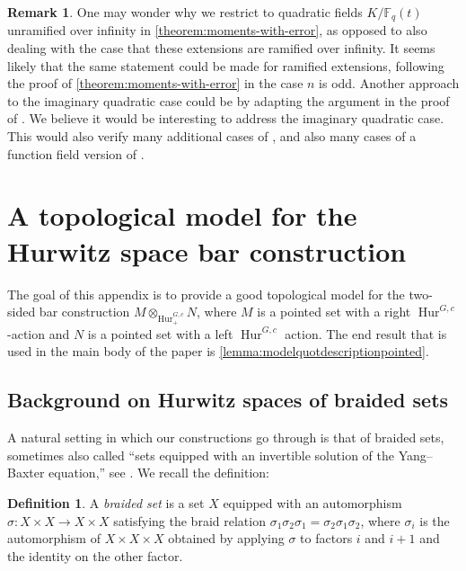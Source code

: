 \documentclass[12 pt]{amsart}
\theoremstyle{plain}
\theoremstyle{definition}
\newtheorem{definition}[theorem]{Definition}
\newtheorem{remark}[theorem]{Remark}
\theoremstyle{remark}
\numberwithin{equation}{section}
\DeclareMathOperator\Hur{Hur}
\begin{document}
\begin{remark}
	\label{remark:imaginary-quadratic}
	One may wonder why we restrict to quadratic fields $K/ \mathbb
	F_q(t)$ unramified over infinity in \autoref{theorem:moments-with-error}, 
	as opposed to also dealing with the
	case that these extensions are ramified over infinity.
	It seems likely that the same statement could be made for ramified
	extensions, following the proof of
	\autoref{theorem:moments-with-error} in the case $n$ is odd.
	Another approach to the imaginary quadratic case could be by adapting
	the argument in the proof of
	\cite[Theorem 1.2]{wood:nonabelian-cohen-lenstra-moments}.
	We believe it would be interesting to address the imaginary quadratic case.
	This would also verify many additional cases of 
	\cite[Conjecture 5.1]{wood:nonabelian-cohen-lenstra-moments},	
	and also many cases of a function field version of
	\cite[Conjecture 1.6]{bostonW:non-abelian-cohen-lenstra-heuristics}.
\end{remark}



\appendix
\section{A topological model for the Hurwitz space bar construction}
\label{appendix:topological-model}


The goal of this appendix is to provide a good topological model for the two-sided bar construction
$M\otimes_{\Hur^{G,c}_+}N$, where $M$ is a pointed set with a right
$\Hur^{G,c}$-action and $N$ is a pointed set with a left $\Hur^{G,c}$ action. The end result that is used in the main body of the paper is \autoref{lemma:modelquotdescriptionpointed}.

\subsection{Background on Hurwitz spaces of braided sets}
A natural setting in which our constructions go through is that of braided sets,
sometimes also called ``sets equipped with an invertible solution of the
Yang--Baxter equation,'' see  \cite{drinfeld2006some,lu2000set,soloviev2000non}. We recall the definition:

\begin{definition}
	A {\em braided set} is a set $X$ equipped with an automorphism $\sigma:
	X\times X \to X\times X$ satisfying the braid relation $\sigma_{1}
	\sigma_{2}\sigma_{1} = \sigma_{2}\sigma_{1}\sigma_{2}$, where
	$\sigma_{i}$ is the automorphism of $X\times X\times X$ obtained by 
	applying $\sigma$ to factors $i$ and $i+1$ and the identity on the other factor.
\end{definition}
\end{document}
